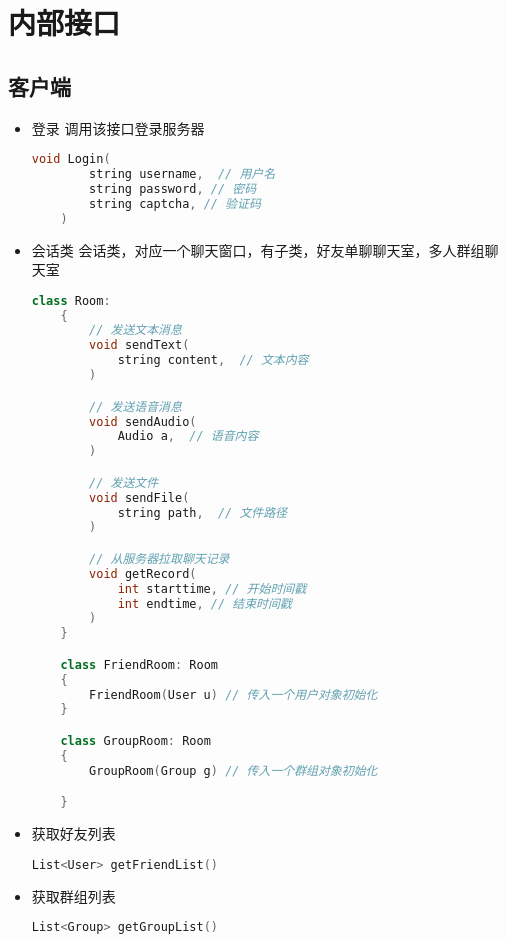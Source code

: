{\color{red}
\section{内部接口}
\subsection{客户端}
\begin{itemize}
    \item 登录
    调用该接口登录服务器
    \begin{lstlisting}[language=c++]
    void Login(
        string username,  // 用户名
        string password, // 密码
        string captcha, // 验证码
    )
    \end{lstlisting}

    \item 会话类
    会话类，对应一个聊天窗口，有子类，好友单聊聊天室，多人群组聊天室
    \begin{lstlisting}[language=c++]
    class Room:
    {
        // 发送文本消息
        void sendText(
            string content,  // 文本内容
        )

        // 发送语音消息
        void sendAudio(
            Audio a,  // 语音内容
        )

        // 发送文件
        void sendFile(
            string path,  // 文件路径
        )

        // 从服务器拉取聊天记录
        void getRecord(
            int starttime, // 开始时间戳
            int endtime, // 结束时间戳
        )
    }

    class FriendRoom: Room
    {
        FriendRoom(User u) // 传入一个用户对象初始化
    }

    class GroupRoom: Room
    {
        GroupRoom(Group g) // 传入一个群组对象初始化

    }

    \end{lstlisting}

    \item 获取好友列表
    \begin{lstlisting}[language=c++]
    List<User> getFriendList()
    \end{lstlisting}

    \item 获取群组列表
    \begin{lstlisting}[language=c++]
    List<Group> getGroupList()
    \end{lstlisting}


\end{itemize}}
